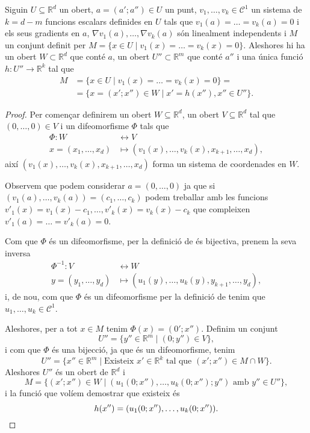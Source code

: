 \documentclass[../Apunts.tex]{subfiles}
\begin{document}
	\begin{theorem}
		\label{thm:Funció implícita}
		Siguin \(U\subseteq\mathbb{R}^{d}\) un obert, \(a=(a';a'')\in U\) un punt, \(v_{1},\dots,v_{k}\in\mathcal{C}^{1}\) un sistema de \(k=d-m\) funcions escalars definides en \(U\) tals que \(v_{1}(a)=\dots=v_{k}(a)=0\) i els seus gradients en \(a\), \(\nabla v_{1}(a),\dots,\nabla v_{k}(a)\) són linealment independents i \(M\) un conjunt definit per \(M=\{x\in U\mid v_{1}(x)=\dots=v_{k}(x)=0\}\). Aleshores hi ha un obert \(W\subset\mathbb{R}^{d}\) que conté \(a\), un obert \(U''\subset\mathbb{R}^{m}\) que conté \(a''\) i una única funció \(h\colon U''\to\mathbb{R}^{k}\) tal que
		\begin{align*}
		M&=\{x\in U\mid v_{1}(x)=\dots=v_{k}(x)=0\}=\\
		&=\{x=(x';x'')\in W\mid x'=h(x''),x''\in U''\}.
		\end{align*}
		\begin{proof}%
			Per començar definirem un obert \(W\subseteq\mathbb{R}^{d}\), un obert \(V\subseteq\mathbb{R}^{d}\) tal que \((0,\dots,0)\in V\) i un difeomorfisme \(\Phi\) tals que
			\begin{align*}
			\Phi\colon W&\longleftrightarrow V\\
			x=(x_{1},\dots,x_{d})&\longmapsto(v_{1}(x),\dots,v_{k}(x),x_{k+1},\dots,x_{d}),
			\end{align*}
			així \((v_{1}(x),\dots,v_{k}(x),x_{k+1},\dots,x_{d})\) forma un sistema de coordenades en \(W\).
			
			Observem que podem considerar \(a=(0,\dots,0)\) ja que si \((v_{1}(a),\dots,v_{k}(a))=(c_{1},\dots,c_{k})\) podem treballar amb les funcions \(v'_{1}(x)=v_{1}(x)-c_{1},\dots,v'_{k}(x)=v_{k}(x)-c_{k}\) que compleixen \(v'_{1}(a)=\dots=v'_{k}(a)=0\).
			
			Com que \(\Phi\) és un difeomorfisme, per la definició de  és bijectiva, prenem la seva inversa
			\begin{align*}
			\Phi^{-1}\colon V&\longleftrightarrow W\\
			y=(y_{1},\dots,y_{d})&\longmapsto(u_{1}(y),\dots,u_{k}(y),y_{k+1},\dots,y_{d}),
			\end{align*}
			i, de nou, com que \(\Phi\) és un difeomorfisme per la definició de  tenim que \(u_{1},\dots,u_{k}\in\mathcal{C}^{1}\).
			
			Aleshores, per a tot \(x\in M\) tenim \(\Phi(x)=(0';x'')\). Definim un conjunt
			\[U''=\{y''\in\mathbb{R}^{m}\mid(0;y'')\in V\},\]
			i com que \(\Phi\) és una bijecció, ja que és un difeomorfisme, tenim
			\[U''=\{x''\in\mathbb{R}^{m}\mid\text{Existeix }x'\in\mathbb{R}^{k}\text{ tal que }(x';x'')\in M\cap W\}.\]
			Aleshores \(U''\) és un obert de \(\mathbb{R}^{d}\) i %
			\[M=\{(x';x'')\in W\mid(u_{1}(0;x''),\dots,u_{k}(0;x'');y'')\text{ amb }y''\in U''\},\] %
			i la funció que volíem demostrar que existeix és
			\[h(x'')=(u_{1}(0;x''),\dots,u_{k}(0;x'')).\qedhere\]
		\end{proof}
	\end{theorem}
\end{document}
